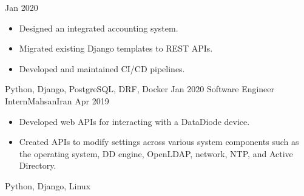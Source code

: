 \begin{experiences}
  {Jan 2020} {
    \begin{itemize}
      \item Designed an integrated accounting system.
      \item Migrated existing Django templates to REST APIs.
      \item Developed and maintained CI/CD pipelines.
    \end{itemize}
  }
  {Python, Django, PostgreSQL, DRF, Docker}
  \emptySeparator
  \experience
  {Jan 2020} {Software Engineer Intern}{Mahsan}{Iran}
  {Apr 2019} {
    \begin{itemize}
      \item Developed web APIs for interacting with a DataDiode device.
      \item Created APIs to modify settings across various system components such as
      the operating system, DD engine, OpenLDAP, network, NTP, and Active Directory.
    \end{itemize}
  }
  {Python, Django, Linux}
  \emptySeparator
\end{experiences}
